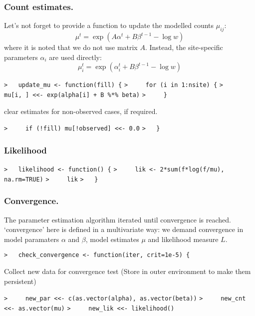 \documentclass[a4paper]{article}
\begin{document}
\subsubsection{Count estimates.}
Let's not forget to provide a function to update the modelled counts $\mu_{ij}$:
$$ \mu^t = \exp(A\alpha^t + B\beta^{t-1} - \log w) $$
where it is noted that we do not use matrix $A$. Instead, the site-specific
parameters $\alpha_i$ are used directly:
$$ \mu_i^t = \exp(\alpha_i^t + B\beta^{t-1} - \log w) $$\par
\verb~>   update_mu <- function(fill) {~\newline
\verb~>     for (i in 1:nsite) {~\newline
\verb~>       mu[i, ] <<- exp(alpha[i] + B %*% beta)~\newline
\verb~>     }~\par
clear estimates for non-observed cases, if required.\par
\verb~>     if (!fill) mu[!observed] <<- 0.0~\newline
\verb~>   }~\par



\subsubsection{Likelihood}\par
\verb~>   likelihood <- function() {~\newline
\verb~>     lik <- 2*sum(f*log(f/mu), na.rm=TRUE)~\newline
\verb~>     lik~\newline
\verb~>   }~\par



\subsubsection{Convergence.}
The parameter estimation algorithm iterated until convergence is reached.
`convergence' here is defined in a multivariate way: we demand convergence in
model paramaters $\alpha$ and $\beta$, model estimates $\mu$ and likelihood measure $L$.\par
\verb~>   check_convergence <- function(iter, crit=1e-5) {~\par

Collect new data for convergence test
(Store in outer environment to make them persistent)\par
\verb~>     new_par <<- c(as.vector(alpha), as.vector(beta))~\newline
\verb~>     new_cnt <<- as.vector(mu)~\newline
\verb~>     new_lik <<- likelihood()~\par
\end{document}
